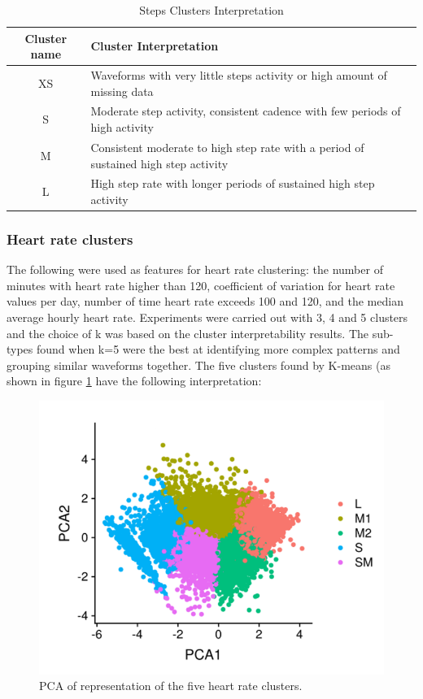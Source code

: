 \documentclass{article}
\begin{document}
\begin{table}[H]
  \caption{Steps Clusters Interpretation}
  \label{steps_inter}
  \centering
  \begin{tabular}{ c|l }
    \toprule
    \cmidrule(r){1-2}
    Cluster name & Cluster Interpretation \\
    \midrule
    XS & Waveforms with very little steps activity or high amount of missing data \\
    \midrule
    S & Moderate step activity, consistent cadence with few periods of high activity\\
    \midrule
    M & Consistent moderate to high step rate with a period of sustained high step activity \\
    \midrule
    L & High step rate with longer periods of sustained high step activity \\
    \bottomrule
    \end{tabular}
\end{table}

\subsubsection{Heart rate clusters}

The following were used as features for heart rate clustering: the number of minutes with heart rate higher than 120, coefficient of variation for heart rate values per day, number of time heart rate exceeds 100 and 120, and the median average hourly heart rate. Experiments were carried out with 3, 4 and 5 clusters and the choice of k was based on the cluster interpretability results. The sub-types found when k=5 were the best at identifying more complex patterns and grouping similar waveforms together. 
The five clusters found by K-means (as shown in figure \ref{fig:HRclusters} have the following interpretation: 

\begin{figure}[!htb]
  \centering
  \includegraphics[]{HRclusters.png}
  \caption{PCA of representation of the five heart rate clusters. }
  \label{fig:HRclusters}
\end{figure}
\end{document}
